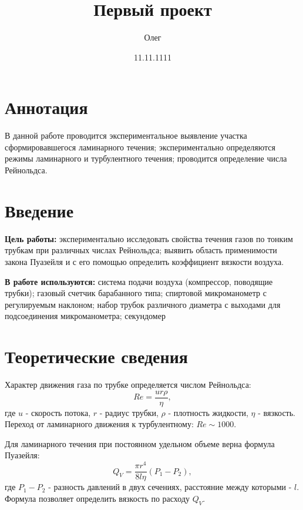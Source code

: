 \documentclass[a4paper, 12pt]{article}
\begin{document}
 
\pagestyle{main}
\begin{titlepage}
    \title{Первый проект}
    \author{Олег}
    \date{11.11.1111}
    \maketitle
\end{titlepage}


    
    \section{Аннотация}
	В данной работе проводится экспериментальное выявление участка сформировавшегося ламинарного течения; экспериментально определяются режимы ламинарного и турбулентного течения; проводится определение числа Рейнольдса.
	
	\section{Введение}
	
	\noindent\textbf{Цель работы:} экспериментально исследовать свойства течения газов по тонким трубкам при различных числах Рейнольдса; выявить область применимости закона Пуазейля и с его помощью определить коэффициент вязкости воздуха.
	
	
	\bigskip
	\noindent\textbf{В работе используются:} система подачи воздуха (компрессор, поводящие трубки); газовый счетчик барабанного типа; спиртовой микроманометр с регулируемым наклоном; набор трубок различного диаметра с выходами для подсоединения микроманометра; секундомер
		
	\section{Теоретические сведения}
	Характер движения газа по трубке определяется числом Рейнольдса:
	\begin{equation}
		Re = \frac{u r \rho}{\eta},
		\label{eq:Re}
	\end{equation}
	где $u$ - скорость потока, $r$ - радиус трубки, $\rho$ - плотность жидкости, $\eta$ - вязкость. Переход от ламинарного движения к турбулентному: $Re \sim 1000$.
	
	Для ламинарного течения при постоянном удельном объеме верна формула Пуазейля:
	\begin{equation}
		Q_V = \frac{\pi r^4}{8 l \eta}(P_1 - P_2),
		\label{eq:Pu}
	\end{equation}
	где $P_1 - P_2$ - разность давлений в двух сечениях, расстояние между которыми - $l$. Формула позволяет определить вязкость по расходу $Q_V$.
	
\end{document}
